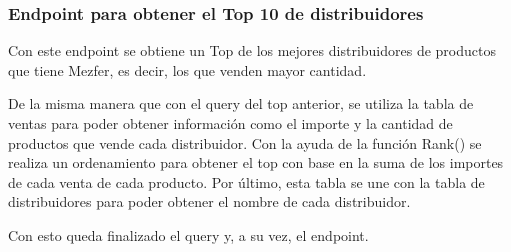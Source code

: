 \subsubsection{Endpoint para obtener el Top 10 de distribuidores}
Con este endpoint se obtiene un Top de los mejores distribuidores de productos que tiene Mezfer, es decir, los que venden mayor cantidad.

De la misma manera que con el query del top anterior, se utiliza la tabla de ventas para poder obtener información como el importe y la cantidad de productos que vende cada distribuidor. Con la ayuda de la función Rank() se realiza un ordenamiento para obtener el top con base en la suma de los importes de cada venta de cada producto. Por último, esta tabla se une con la tabla de distribuidores para poder obtener el nombre de cada distribuidor.

Con esto queda finalizado el query y, a su vez, el endpoint.